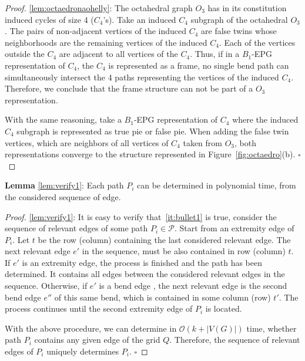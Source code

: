 \documentclass[runningheads]{llncs}
\begin{document}
\begin{proof}
\ref{lem:octaedronaohelly}:
The octahedral graph $ O_3 $ has in its constitution induced cycles of size 4 ($ C_4$'s). 
Take an induced $ C_4 $ subgraph  of the octahedral $ O_3 $. The pairs of non-adjacent vertices of the induced $C_4$ are false twins whose neighborhoods are the remaining vertices of the induced $C_4$. Each of the vertices outside the $C_4$ are adjacent to all vertices of the $C_4$. Thus, if in a $ B_1$-EPG representation of $C_4$, the $ C_4 $ is represented as a frame, no single bend path can simultaneously intersect the 4 paths representing the vertices of the induced $ C_4 $. Therefore, we conclude that the frame structure can not be part of a $ O_3 $ representation.

With the same reasoning, take a $ B_1$-EPG representation of $C_4$ where the induced $ C_4 $ subgraph is represented as true pie or false pie. When adding the false twin vertices, which are neighbors of all vertices of $ C_4 $ taken from $ O_3 $, both representations converge to the structure represented in Figure~\ref{fig:octaedro}(b). 
$\square$ \end{proof}

%

\begin{lemma*}\textbf{Lemma} \ref{lem:verify1}:
Each path $P_i$ can be determined in polynomial time, from the considered sequence of edge.
\end{lemma*}

\begin{proof}%
\ref{lem:verify1}: 
It is easy to verify that~\ref{it:bullet1} is true, consider the sequence of relevant edges of some path $P_i\in \mathcal{P}$. Start from an extremity edge of $P_i$. Let $t$ be the row (column) containing the last considered relevant edge. The next relevant edge $e'$ in the sequence, must be also contained in row (column) $t$. If $e'$ is an extremity edge, the process is finished and the path has been determined. It contains all edges between the considered relevant edges in the sequence. Otherwise, if $e'$ is a bend edge , the next relevant edge is the second bend edge $e''$ of this same bend, which is contained in some column (row) $t'$. The process continues until the second extremity edge of $P_i$ is located.   

With the above procedure, we can determine in $\mathcal{O}(k+|V(G)|)$ time, whether path $P_i$ contains any given edge of the grid $Q$. Therefore, the sequence of relevant edges of $P_i$ uniquely determines $P_i$.
$\square$ \end{proof}
\end{document}
